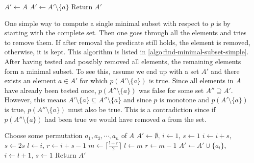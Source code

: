 \begin{algorithm}[ht]
  \begin{algorithmic}
    \State $A' \gets A$
        \State $A' \gets A' \setminus \{ a \}$
      \EndIf
    \EndFor
    \State Return $A'$
  \end{algorithmic}
  \caption{$\textsc{SimpleFindMinimalSubset}(A, p)$}
  \label{algo:find-minimal-subset-simple}
\end{algorithm}

One simple way to compute a single minimal subset with respect to $p$ is by starting with the complete set. Then one goes through all the elements and tries to remove them. If after removal the predicate still holds, the element is removed, otherwise, it is kept. This algorithm is listed in \cref{algo:find-minimal-subset-simple}. After having tested and possibly removed all elements, the remaining elements form a minimal subset. To see this, assume we end up with a set $A'$ and there exists an element $a \in A'$ for which $p(A' \setminus \{ a \})$ is true. Since all elements in $A$ have already been tested once, $p(A'' \setminus \{ a \})$ was false for some set $A'' \supseteq A'$. However, this means $A' \setminus \{ a \} \subseteq A'' \setminus \{ a \}$ and since $p$ is monotone and $p(A' \setminus \{ a \})$ is true, $p(A'' \setminus \{ a \})$ must also be true. This is a contradiction since if $p(A'' \setminus \{ a \})$ had been true we would have removed $a$ from the set.

\begin{algorithm}[ht]
  \begin{algorithmic}
    \State Choose some permutation $a_1, a_2, \cdots, a_n$ of $A$
    \State $A' \gets \emptyset$, \enspace $i \gets 1$, \enspace $s \gets 1$
        \State $i \gets i + s$, \enspace $s \gets 2 s$
      \Else
        \State $l \gets i$, \enspace $r \gets i + s - 1$
          \State $m \gets \lceil \frac{l + r}{2} \rceil$
            \State $l \gets m$
          \Else
            \State $r \gets m - 1$
          \EndIf
        \EndWhile
        \State $A' \gets A' \cup \{ a_l \}$, \enspace $i \gets l + 1$, \enspace $s \gets 1$
      \EndIf
    \EndWhile
    \State Return $A'$
  \end{algorithmic}
  \caption{$\textsc{FindMinimalSubset}(A, p)$}
  \label{algo:find-minimal-subset}
\end{algorithm}

